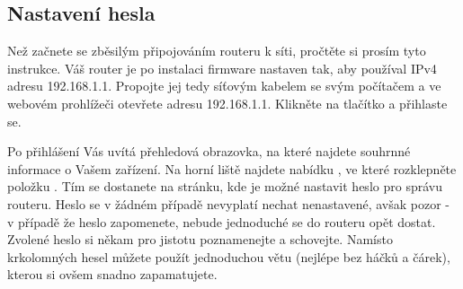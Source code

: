 \subsection{Nastavení hesla}
Než začnete se zběsilým připojováním routeru k síti, pročtěte si prosím tyto
instrukce. Váš router je po instalaci firmware nastaven tak, aby používal IPv4 adresu
192.168.1.1. Propojte jej tedy síťovým kabelem se svým počítačem a ve webovém
prohlížeči otevřete adresu 192.168.1.1. Klikněte na tlačítko  a
přihlaste se.

Po přihlášení Vás uvítá přehledová obrazovka, na které najdete souhrnné informace
o Vašem zařízení. Na horní liště najdete nabídku , ve které rozklepněte
položku . Tím se dostanete na stránku, kde je možné nastavit
heslo pro správu routeru. Heslo se v žádném případě nevyplatí nechat nenastavené,
avšak pozor - v případě že heslo zapomenete, nebude jednoduché se do routeru
opět dostat. Zvolené heslo si někam pro jistotu poznamenejte a schovejte.
Namísto krkolomných hesel můžete použít jednoduchou větu (nejlépe bez háčků
a čárek), kterou si ovšem snadno zapamatujete.
